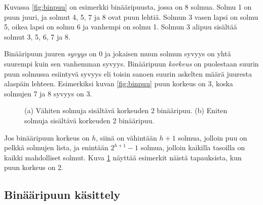 Kuvassa \ref{fig:binpuu} on esimerkki binääripuusta, jossa on 8 solmua.
Solmu 1 on puun juuri, ja solmut 4, 5, 7 ja 8 ovat puun lehtiä.
Solmun 3 vasen lapsi on solmu 5, oikea lapsi on solmu 6
ja vanhempi on solmu 1.
Solmun 3 alipuu sisältää solmut 3, 5, 6, 7 ja 8.

Binääripuun juuren \emph{syvyys} on 0 ja jokaisen muun solmun syvyys on yhtä
suurempi kuin sen vanhemman syvyys.
Binääripuun \emph{korkeus} on puolestaan
suurin puun solmussa esiintyvä syvyys
eli toisin sanoen suurin askelten määrä juuresta alaspäin lehteen.
Esimerkiksi kuvan \ref{fig:binpuu} puun korkeus on 3,
koska solmujen 7 ja 8 syvyys on 3.

\begin{figure}
\center
{}
\caption{(a) Vähiten solmuja sisältävä korkeuden 2 binääripuu.
(b) Eniten solmuja sisältävä korkeuden 2 binääripuu.}
\label{fig:binraj}
\end{figure}

Jos binääripuun korkeus on $h$, siinä on vähintään $h+1$ solmua,
jolloin puu on pelkkä solmujen lista,
ja enintään $2^{h+1}-1$ solmua,
jolloin kaikilla tasoilla on kaikki mahdolliset solmut.
Kuva \ref{fig:binraj} näyttää esimerkit näistä tapauksista,
kun puun korkeus on $2$.

\subsection{Binääripuun käsittely}

